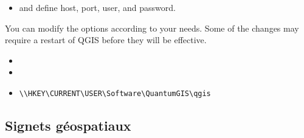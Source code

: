 
\begin{itemize}
\item {} and define host, port, user, and password.
\end{itemize}

You can modify the options according to your needs. Some of the changes may 
require a restart of QGIS before they will be effective.

\begin{itemize}
\item {}
\item {}
\item {}
\begin{verbatim}
\\HKEY\CURRENT\USER\Software\QuantumGIS\qgis
\end{verbatim}
\end{itemize}

%
%
%

\subsection{Signets géospatiaux}\label{sec:bookmarks}

